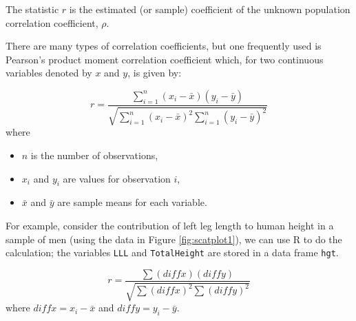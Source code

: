 \documentclass[
  oneside]{krantz}
\newenvironment{Shaded}{\begin{snugshade}}{\end{snugshade}}
\newcommand{\CommentTok}[1]{\textcolor[rgb]{0.56,0.35,0.01}{\textit{#1}}}
\newcommand{\DecValTok}[1]{\textcolor[rgb]{0.00,0.00,0.81}{#1}}
\newcommand{\DocumentationTok}[1]{\textcolor[rgb]{0.56,0.35,0.01}{\textbf{\textit{#1}}}}
\newcommand{\FunctionTok}[1]{\textcolor[rgb]{0.00,0.00,0.00}{#1}}
\newcommand{\NormalTok}[1]{#1}
\newcommand{\OtherTok}[1]{\textcolor[rgb]{0.56,0.35,0.01}{#1}}
\newcommand{\SpecialCharTok}[1]{\textcolor[rgb]{0.00,0.00,0.00}{#1}}
\providecommand{\tightlist}{%
  \setlength{\itemsep}{0pt}\setlength{\parskip}{0pt}}
\begin{document}
The statistic \(r\) is the estimated (or sample) coefficient of the unknown population correlation coefficient, \(\rho\).

There are many types of correlation coefficients, but one frequently used is Pearson's product moment correlation coefficient which, for two continuous variables denoted by \(x\) and \(y\), is given by:

\[r=\frac{\sum_{i=1}^{n}(x_i-\bar{x})(y_i-\bar{y})}{\sqrt{\sum_{i=1}^{n}(x_i-\bar{x})^2\sum_{i=1}^{n}(y_i-\bar{y})^2}}\]
where

\begin{itemize}
\tightlist
\item
  \(n\) is the number of observations,
\item
  \(x_i\) and \(y_i\) are values for observation \(i\),
\item
  \(\bar x\) and \(\bar y\) are sample means for each variable.
\end{itemize}

For example, consider the contribution of left leg length to human height in a sample of men (using the data in Figure \ref{fig:scatplot1}), we can use R to do the calculation; the variables \texttt{LLL} and \texttt{TotalHeight} are stored in a data frame \texttt{hgt}.

\[r=\frac{\sum(diffx)(diffy)}{\sqrt{\sum (diffx)^2\sum(diffy)^2}}\]
where \(diffx = x_i - \bar x\) and \(diffy = y_i - \bar y\).

\begin{Shaded}
\end{Shaded}
\end{document}
